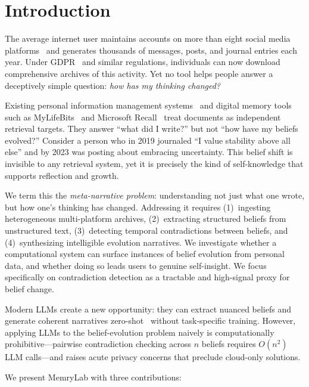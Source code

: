 \documentclass[conference]{IEEEtran}
\begin{document}
\section{Introduction}
\label{sec:intro}

The average internet user maintains accounts on more than eight social media platforms~\cite{datareportal2024} and generates thousands of messages, posts, and journal entries each year. Under GDPR~\cite{gdpr2016} and similar regulations, individuals can now download comprehensive archives of this activity. Yet no tool helps people answer a deceptively simple question: \emph{how has my thinking changed?}

Existing personal information management systems~\cite{jones2007pim,lansdale1988psychology} and digital memory tools such as MyLifeBits~\cite{gemmell2002mylifebits} and Microsoft Recall~\cite{microsoft2024recall} treat documents as independent retrieval targets. They answer ``what did I write?'' but not ``how have my beliefs evolved?'' Consider a person who in 2019 journaled ``I value stability above all else'' and by 2023 was posting about embracing uncertainty. This belief shift is invisible to any retrieval system, yet it is precisely the kind of self-knowledge that supports reflection and growth.

We term this the \emph{meta-narrative problem}: understanding not just what one wrote, but how one's thinking has changed. Addressing it requires (1)~ingesting heterogeneous multi-platform archives, (2)~extracting structured beliefs from unstructured text, (3)~detecting temporal contradictions between beliefs, and (4)~synthesizing intelligible evolution narratives. We investigate whether a computational system can surface instances of belief evolution from personal data, and whether doing so leads users to genuine self-insight. We focus specifically on contradiction detection as a tractable and high-signal proxy for belief change.

Modern LLMs create a new opportunity: they can extract nuanced beliefs and generate coherent narratives zero-shot~\cite{brown2020gpt3,touvron2023llama} without task-specific training. However, applying LLMs to the belief-evolution problem naively is computationally prohibitive---pairwise contradiction checking across $n$ beliefs requires $O(n^2)$ LLM calls---and raises acute privacy concerns that preclude cloud-only solutions.

We present MemryLab with three contributions:
\end{document}
